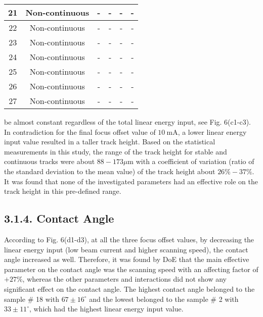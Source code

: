 \documentclass[10pt]{article}
\begin{document}
\begin{center}
\begin{tabular}{|c|c|c|c|c|c|}
\hline
21 & Non-continuous & - & - & - & - \\
\hline
22 & Non-continuous & - & - & - & - \\
\hline
23 & Non-continuous & - & - & - & - \\
\hline
24 & Non-continuous & - & - & - & - \\
\hline
25 & Non-continuous & - & - & - & - \\
\hline
26 & Non-continuous & - & - & - & - \\
\hline
27 & Non-continuous & - & - & - & - \\
\hline
\end{tabular}
\end{center}

be almost constant regardless of the total linear energy input, see Fig. 6(c1-c3). In contradiction for the final focus offset value of $10 \mathrm{~mA}$, a lower linear energy input value resulted in a taller track height. Based on the statistical measurements in this study, the range of the track height for stable and continuous tracks were about $88-173 \mu \mathrm{m}$ with a coefficient of variation (ratio of the standard deviation to the mean value) of the track height about $26 \%-37 \%$. It was found that none of the investigated parameters had an effective role on the track height in this pre-defined range.

\subsection*{3.1.4. Contact Angle}
According to Fig. 6(d1-d3), at all the three focus offset values, by decreasing the linear energy input (low beam current and higher scanning speed), the contact angle increased as well. Therefore, it was found by DoE that the main effective parameter on the contact angle was the scanning speed with an affecting factor of $+27 \%$, whereas the other parameters and interactions did not show any significant effect on the contact angle. The highest contact angle belonged to the sample \# 18 with $67 \pm 16^{\circ}$ and the lowest belonged to the sample \# 2 with $33 \pm 11^{\circ}$, which had the highest linear energy input value.
\end{document}
